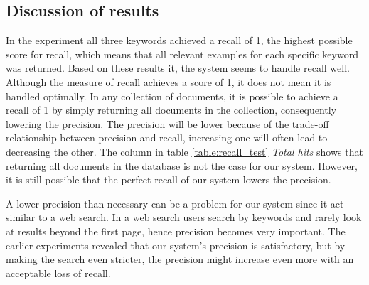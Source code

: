 \subsection{Discussion of results}

In the experiment all three keywords achieved a recall of 1, the highest possible score for recall, which means that all relevant examples for each specific keyword was returned. Based on these results it, the system seems to handle recall well. Although the measure of recall achieves a score of 1, it does not mean it is handled optimally. In any collection of documents, it is possible to achieve a recall of 1 by simply returning all documents in the collection, consequently lowering the precision. The precision will be lower because of the trade-off relationship between precision and recall, increasing one will often lead to decreasing the other. The column in table \ref{table:recall_test} \textit{Total hits} shows that returning all documents in the database is not the case for our system. However, it is still possible that the perfect recall of our system lowers the precision. 

A lower precision than necessary can be a problem for our system since it act similar to a web search. In a web search users search by keywords and rarely look at results beyond the first page, hence precision becomes very important. The earlier experiments revealed that our system's precision is satisfactory, but by making the search even stricter, the precision might increase even more with an acceptable loss of recall.

\cleardoublepage